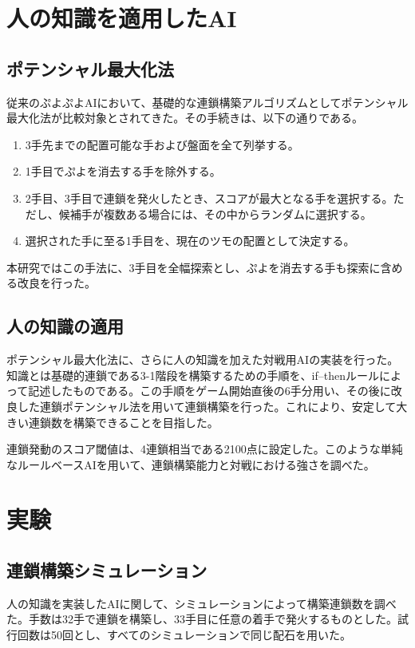 \documentclass[twocolumn, a4paper]{UECIEresume}
\begin{document}
\section{人の知識を適用したAI}
\subsection{ポテンシャル最大化法}
従来のぷよぷよAIにおいて、基礎的な連鎖構築アルゴリズムとしてポテンシャル最大化法が比較対象とされてきた\cite{puyo_temp, puyo_monte}。その手続きは、以下の通りである。
\begin{enumerate}
\item 3手先までの配置可能な手および盤面を全て列挙する。
\item 1手目でぷよを消去する手を除外する。
\item 2手目、3手目で連鎖を発火したとき、スコアが最大となる手を選択する。ただし、候補手が複数ある場合には、その中からランダムに選択する。
\item 選択された手に至る1手目を、現在のツモの配置として決定する。
\end{enumerate}

本研究ではこの手法に、3手目を全幅探索とし、ぷよを消去する手も探索に含める改良を行った。

\subsection{人の知識の適用}
ポテンシャル最大化法に、さらに人の知識を加えた対戦用AIの実装を行った。知識とは基礎的連鎖である3-1階段を構築するための手順を、if--thenルールによって記述したものである。この手順をゲーム開始直後の6手分用い、その後に改良した連鎖ポテンシャル法を用いて連鎖構築を行った。これにより、安定して大きい連鎖数を構築できることを目指した。

連鎖発動のスコア閾値は、4連鎖相当である2100点に設定した。このような単純なルールベースAIを用いて、連鎖構築能力と対戦における強さを調べた。

\section{実験}
\subsection{連鎖構築シミュレーション}
人の知識を実装したAIに関して、シミュレーションによって構築連鎖数を調べた。手数は32手で連鎖を構築し、33手目に任意の着手で発火するものとした。試行回数は50回とし、すべてのシミュレーションで同じ配石を用いた。
\end{document}
